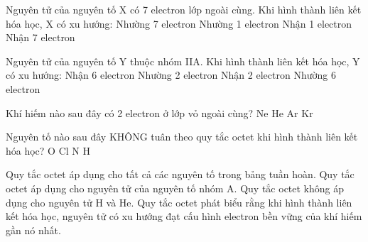 \begin{ex}
    Nguyên tử của nguyên tố X có 7 electron lớp ngoài cùng. Khi hình thành liên kết hóa học, X có xu hướng:
    \choice
    {Nhường 7 electron}
    {Nhường 1 electron}
    {\True Nhận 1 electron}
    {Nhận 7 electron}
\end{ex}

\begin{ex}
    Nguyên tử của nguyên tố Y thuộc nhóm IIA. Khi hình thành liên kết hóa học, Y có xu hướng:
    \choice
    {Nhận 6 electron}
    {\True Nhường 2 electron}
    {Nhận 2 electron}
    {Nhường 6 electron}
\end{ex}


\begin{ex}
    Khí hiếm nào sau đây có 2 electron ở lớp vỏ ngoài cùng?
    \choice
    {Ne}
    {\True He}
    {Ar}
    {Kr}
\end{ex}

\begin{ex}
    Nguyên tố nào sau đây KHÔNG tuân theo quy tắc octet khi hình thành liên kết hóa học?
    \choice
    {O}
    {Cl}
    {N}
    {\True H}
\end{ex}


\begin{ex}
    Quy tắc octet áp dụng cho tất cả các nguyên tố trong bảng tuần hoàn.
    {Quy tắc octet áp dụng cho nguyên tử của nguyên tố nhóm A.}
    {\True Quy tắc octet không áp dụng cho nguyên tử H và He.}
    {Quy tắc octet phát biểu rằng khi hình thành liên kết hóa học, nguyên tử có xu hướng đạt cấu hình electron bền vững của khí hiếm gần nó nhất.}
\end{ex}


